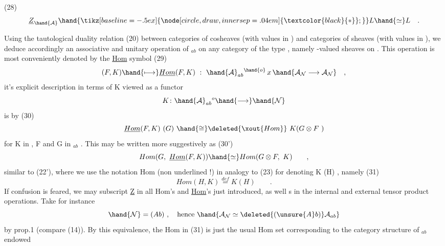 
(28) \[ \underline{Z}_{\hand{\mathcal{A}}} \hand{\mathbin{\tikz[baseline=-.5ex]{\node[circle,draw,inner sep=.04em] {\ensuremath{\textcolor{black}{*}}};}}} L \hand{\simeq} L \quad . \]

Using the tautological duality relation (20) between categories of
cosheaves (with values in ) and categories of sheaves (with values in
), we deduce accordingly an associative and unitary operation
of $_{ab}$ on any category of the type , namely -valued sheaves on .
This operation is most conveniently denoted by the \uline{Hom} symbol
(29) \[ (F, K) \hand{\longmapsto} \underline{Hom}(F,K) \ : \ \hand{\mathcal{A}}_{ab}{}^{\hand{o}} \, x \, \hand{\mathcal{A}_{\mathcal{N}} \longrightarrow \mathcal{A}_{\mathcal{N}}} \quad , \]
it's explicit description in terms of K\hand{,} viewed as a functor
\[ K\colon \hand{\mathcal{A}}_{ab}{}^{o} \hand{\longrightarrow} \hand{\mathcal{N}} \]
is by
(30) \[ \underline{Hom}(F,K)\ (G) \ \hand{\cong}\deleted{\xout{Hom}} \ K(G \otimes F\ ) \]
for K in , F and G in $_{ab}$ . This may be written more suggestively as
(30') \[ Hom(G,\ \underline{Hom}(F,K)) \hand{\simeq} Hom(G\otimes F,\ K) \qquad , \]
similar to (22'), where we use the notation Hom (non underlined !) in
analogy to (23) for denoting K (H) , namely
(31) \[ Hom(H,K) \overset{def}{=} K(H) \qquad . \]
If confusion is feared, we may   subscript \uline{Z} in all Hom's and
\uline{Hom}'s just introduced, as well s in the internal and external tensor
product operations. \hand{$\otimes$, $*$, $\circledast$}
Take for instance
\[ \hand{\mathcal{N}} = (Ab) \ , \quad\text{hence}\ \hand{\mathcal{A}_{\mathcal{N}} \simeq \deleted{(\unsure{A}b)} \mathcal{A}_{ab}} \]
by prop.1 (compare (14)). By this equivalence, the Hom in (31) is\hand{,} just
the usual Hom set corresponding to the category structure of $_{ab}$  endowed
